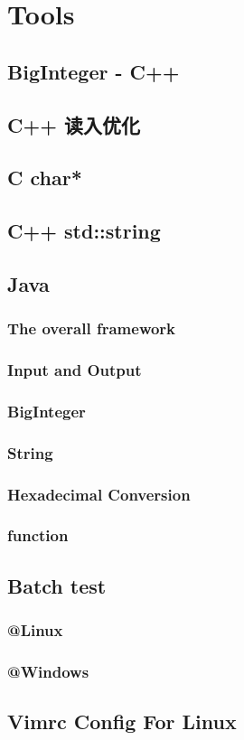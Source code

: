 \section{Tools}
	\subsection{BigInteger - C++}
		
	\subsection{C++ 读入优化}
		
	\subsection{C char*}
		
	\subsection{C++ std::string}
		
	\subsection{Java}
		\subsubsection{The overall framework}
			
		\subsubsection{Input and Output}
			
		\subsubsection{BigInteger}
			
		\subsubsection{String}
			
		\subsubsection{Hexadecimal Conversion}
			
		\subsubsection{function}
			
	\subsection{Batch test}
		\subsubsection{@Linux}
			
		\subsubsection{@Windows}
			
	\subsection{Vimrc Config For Linux}
		
